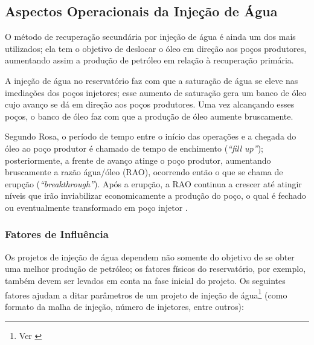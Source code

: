 \subsection{Aspectos Operacionais da Inje\c{c}\~{a}o de \'{A}gua}

O m\'{e}todo de recupera\c{c}\~{a}o secund\'{a}ria por inje\c{c}\~{a}o de \'{a}gua \'{e} ainda um dos mais utilizados; ela tem o objetivo de deslocar o \'{o}leo em dire\c{c}\~{a}o aos po\c{c}os produtores, aumentando assim a produ\c{c}\~{a}o de petr\'{o}leo em rela\c{c}\~{a}o \`{a} recupera\c{c}\~{a}o prim\'{a}ria.

A inje\c{c}\~{a}o de \'{a}gua no reservat\'{o}rio faz com que a satura\c{c}\~{a}o de \'{a}gua se eleve nas imedia\c{c}\~{o}es dos po\c{c}os injetores; esse aumento de satura\c{c}\~{a}o gera um banco de \'{o}leo cujo avan\c{c}o se d\'{a} em dire\c{c}\~{a}o aos po\c{c}os produtores. Uma vez alcan\c{c}ando esses po\c{c}os, o banco de \'{o}leo faz com que a produ\c{c}\~{a}o de \'{o}leo aumente bruscamente. 

Segundo Rosa, o per\'{i}odo de tempo entre o in\'{i}cio das opera\c{c}\~{o}es e a chegada do \'{o}leo ao po\c{c}o produtor \'{e} chamado de tempo de enchimento (\textit{``fill up''}); posteriormente, a frente de avan\c{c}o atinge o po\c{c}o produtor, aumentando bruscamente a raz\~{a}o \'{a}gua/\'{o}leo (RAO), ocorrendo ent\~{a}o o que se chama de erup\c{c}\~{a}o (\textit{``breakthrough''}). Ap\'{o}s a erup\c{c}\~{a}o, a RAO continua a crescer at\'{e} atingir n\'{i}veis que ir\~{a}o inviabilizar economicamente a produ\c{c}\~{a}o do po\c{c}o, o qual \'{e} fechado ou eventualmente transformado em po\c{c}o injetor \cite{engres}.

\subsubsection{Fatores de Influ\^{e}ncia}

Os projetos de inje\c{c}\~{a}o de \'{a}gua dependem n\~{a}o somente do objetivo de se obter uma melhor produ\c{c}\~{a}o de petr\'{o}leo; os fatores f\'{i}sicos do reservat\'{o}rio, por exemplo, tamb\'{e}m devem ser levados em conta na fase inicial do projeto. Os seguintes fatores ajudam a ditar par\^{a}metros de um projeto de inje\c{c}\~{a}o de \'{a}gua\footnote{Ver \cite[pp. 652-653]{engres}} (como formato da malha de inje\c{c}\~{a}o, n\'{u}mero de injetores, entre outros):

